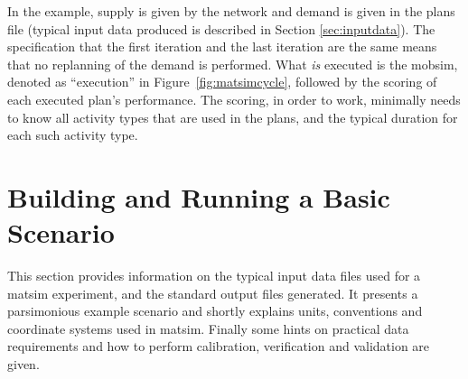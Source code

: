 In the example, supply is given by 
the network and demand is given in the plans file (typical input data produced is described in Section \ref{sec:inputdata}). 
%
The specification that the first iteration and the last iteration are the same means that no \gls{replanning} of the demand is performed.  
%
What \emph{is} executed is the mobsim, denoted as ``execution'' in Figure~\ref{fig:matsimcycle}, followed by the scoring of each executed plan's performance.
%
The scoring, in order to work, minimally needs to know all activity types that are used in the plans, and the typical duration for each such activity type.





 
 

\section{Building and Running a Basic Scenario}
\label{sec:buildingbasicscenario}
This section provides information on the typical input data files used for a \gls{matsim} experiment, and the standard output files generated. It presents a parsimonious example scenario and shortly explains units, conventions and coordinate systems used in \gls{matsim}. Finally some hints on practical data requirements and how to perform calibration, verification and validation are given.

